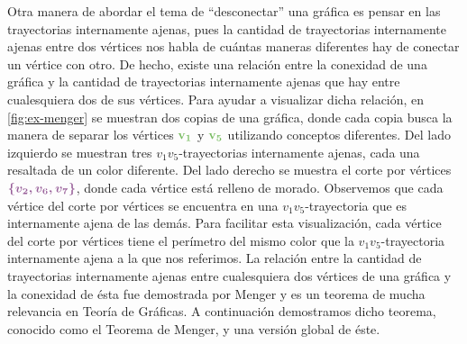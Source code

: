 Otra manera de abordar el tema de ``desconectar'' una gr\'afica es  pensar en
las trayectorias internamente ajenas, pues la cantidad de trayectorias
internamente ajenas entre dos v\'ertices nos habla de cu\'antas maneras
diferentes hay de conectar un v\'ertice con otro. De hecho, existe una
relaci\'on entre la conexidad de una gr\'afica y la cantidad de trayectorias
internamente ajenas que hay entre cualesquiera dos de sus v\'ertices. Para
ayudar a visualizar dicha relaci\'on, en \cref{fig:ex-menger} se muestran dos
copias de una gr\'afica, donde cada copia busca la manera de separar los
v\'ertices $\color{verde} \bf v_1$ y $\color{verde} \bf v_5$ utilizando
conceptos diferentes. Del lado izquierdo se muestran tres $v_1v_5$-trayectorias
internamente ajenas, cada una resaltada de un color diferente. Del lado derecho
se muestra el corte por v\'ertices ${\color{morado}\boldsymbol {\{v_2, v_6,
v_7\} }}$, donde cada v\'ertice est\'a relleno de morado. Observemos que cada
v\'ertice del corte por v\'ertices se encuentra en una $v_1v_5$-trayectoria que
es internamente ajena de las dem\'as. Para facilitar esta visualizaci\'on, cada
v\'ertice del corte por v\'ertices tiene el per\'imetro del mismo color que la
$v_1v_5$-trayectoria internamente ajena a la que nos referimos. La relaci\'on
entre la cantidad de trayectorias internamente ajenas entre cualesquiera dos
v\'ertices de una gr\'afica y la conexidad de \'esta fue demostrada por Menger y
es un teorema de mucha relevancia en Teor\'ia de Gr\'aficas. A continuaci\'on
demostramos dicho teorema, conocido como el Teorema de Menger, y una versi\'on
global de \'este. 

